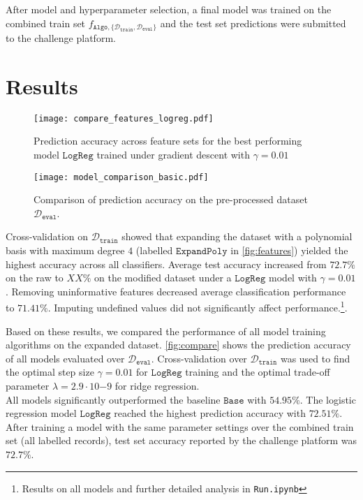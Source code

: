 \documentclass[10pt,conference,compsocconf]{IEEEtran}
\newcommand{\Deval}{\mathcal{D}_{\mathtt{eval}}}
\newcommand{\Dtrain}{\mathcal{D}_{\mathtt{train}}}
\newcommand{\classifier}[2]{f_{#1, #2}}
\newcommand{\Train}{\mathtt{Algo}}
\newcommand{\Baseline}{\mathtt{Base}}
\newcommand{\LogReg}{\mathtt{LogReg}}
\begin{document}
After model and hyperparameter selection, a final model was trained on the combined train set
$\classifier{\Train}{\{ \Dtrain, \Deval\}}$ and the test set predictions were submitted to the challenge platform. 

\vspace*{-3.5mm}
\section{Results}
\label{sec:results}

\begin{figure}
	\texttt{[image: compare\_features\_logreg.pdf]}
	\caption{Prediction accuracy across feature sets for the best performing model $\LogReg$ trained under gradient descent with $\gamma = 0.01$}
	\label{fig:features}
	\setlength{\belowcaptionskip}{-10pt}
\end{figure}

\begin{figure}
	\texttt{[image: model\_comparison\_basic.pdf]}
	\caption{Comparison of prediction accuracy on the pre-processed dataset $\Deval$.}
	\label{fig:compare}
	\setlength{\belowcaptionskip}{-1pt}
	\vspace*{-5mm}
\end{figure}

Cross-validation on $\Dtrain$ showed that expanding the dataset with a polynomial basis with maximum degree $4$ (labelled $\mathtt{ExpandPoly}$ in \autoref{fig:features}) yielded the highest accuracy across all classifiers. Average test accuracy increased from $72.7\%$ on the raw to $XX\%$ on the modified dataset under a $\LogReg$ model with $\gamma = 0.01$. Removing uninformative features decreased average classification performance to $71.41\%$. Imputing undefined values did not significantly affect performance.\footnote{Results on all models and further detailed analysis in \texttt{Run.ipynb}}.

Based on these results, we compared the performance of all model training algorithms on the expanded dataset. \autoref{fig:compare} shows the prediction accuracy of all models evaluated over $\Deval$. Cross-validation over $\Dtrain$ was used to find the optimal step size $\gamma=0.01$ for $\LogReg$ training and the optimal trade-off parameter $\lambda=2.9 \cdot 10{-9}$ for ridge regression.\\
All models significantly outperformed the baseline $\Baseline$ with $54.95\%$. The logistic regression model $\LogReg$ reached the highest prediction accuracy with $72.51\%$. After training a model with the same parameter settings over the combined train set (all labelled records), test set accuracy reported by the challenge platform was $72.7\%$. 
\end{document}
